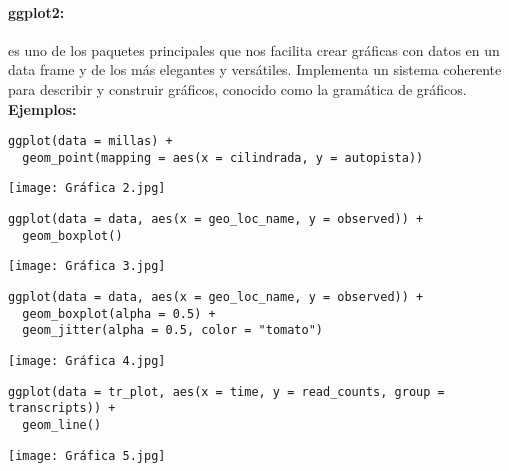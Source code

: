 \documentclass{article}
\begin{document}
\paragraph{ggplot2:}es uno de los paquetes principales que nos facilita crear gráficas con datos en un data frame y de los más elegantes y versátiles. Implementa un sistema coherente para describir y construir gráficos, conocido como la gramática de gráficos.\\
\textbf{Ejemplos:}
\begin{lstlisting}
ggplot(data = millas) +
  geom_point(mapping = aes(x = cilindrada, y = autopista))

\end{lstlisting}
\begin{center}
    \texttt{[image: Gráfica 2.jpg]}
\end{center}
\begin{lstlisting}
ggplot(data = data, aes(x = geo_loc_name, y = observed)) + 
  geom_boxplot()
\end{lstlisting}
\begin{center}
    \texttt{[image: Gráfica 3.jpg]}
\end{center}
\begin{lstlisting}
ggplot(data = data, aes(x = geo_loc_name, y = observed)) + 
  geom_boxplot(alpha = 0.5) +
  geom_jitter(alpha = 0.5, color = "tomato")
\end{lstlisting}
\begin{center}
    \texttt{[image: Gráfica 4.jpg]}
\end{center}
\begin{lstlisting}
ggplot(data = tr_plot, aes(x = time, y = read_counts, group = transcripts)) + 
  geom_line()
\end{lstlisting}
\begin{center}
    \texttt{[image: Gráfica 5.jpg]}
\end{center}
\end{document}
